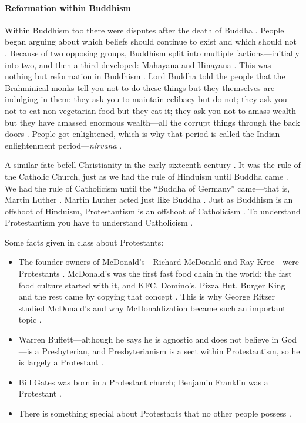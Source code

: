 \paragraph{Reformation within Buddhism}
Within Buddhism too there were disputes after the death of Buddha . People began arguing about which beliefs should continue to exist and which should not .
Because of two opposing groups, Buddhism split into multiple factions---initially into two, and then a third developed: Mahayana and Hinayana . This was nothing but reformation in Buddhism .
Lord Buddha told the people that the Brahminical monks tell you not to do these things but they themselves are indulging in them: they ask you to maintain celibacy but do not; they ask you not to eat non-vegetarian food but they eat it; they ask you not to amass wealth but they have amassed enormous wealth---all the corrupt things through the back doors . People got enlightened, which is why that period is called the Indian enlightenment period---\textit{nirvana} .

\begin{KeyConcept}
A similar fate befell Christianity in the early sixteenth century . It was the rule of the Catholic Church, just as we had the rule of Hinduism until Buddha came .
We had the rule of Catholicism until the ``Buddha of Germany'' came---that is, Martin Luther . Martin Luther acted just like Buddha .
Just as Buddhism is an offshoot of Hinduism, Protestantism is an offshoot of Catholicism . To understand Protestantism you have to understand Catholicism .
\end{KeyConcept}

\begin{DataFact}
Some facts given in class about Protestants:
\begin{itemize}
    \item The founder-owners of McDonald's---Richard McDonald and Ray Kroc---were Protestants . McDonald's was the first fast food chain in the world; the fast food culture started with it, and KFC, Domino's, Pizza Hut, Burger King and the rest came by copying that concept . This is why George Ritzer studied McDonald's and why McDonaldization became such an important topic .
    \item Warren Buffett---although he says he is agnostic and does not believe in God---is a Presbyterian, and Presbyterianism is a sect within Protestantism, so he is largely a Protestant .
    \item Bill Gates was born in a Protestant church; Benjamin Franklin was a Protestant .
    \item There is something special about Protestants that no other people possess .
\end{itemize}
\end{DataFact}

